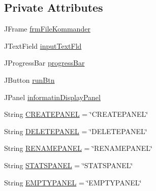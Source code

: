\subsection*{Private Attributes}
\begin{DoxyCompactItemize}
\item 
J\-Frame \hyperlink{classcom_1_1poly_1_1nlp_1_1filekommander_1_1views_1_1_file_kommander_g_u_i_v2_a98fff3b4c6caac91d624b07beab03af5}{frm\-File\-Kommander}
\item 
J\-Text\-Field \hyperlink{classcom_1_1poly_1_1nlp_1_1filekommander_1_1views_1_1_file_kommander_g_u_i_v2_a43db9456e6f586e8a7d59c86dc90cdc8}{input\-Text\-Fld}
\item 
J\-Progress\-Bar \hyperlink{classcom_1_1poly_1_1nlp_1_1filekommander_1_1views_1_1_file_kommander_g_u_i_v2_a610f5e81072e2d7e81ddd92bcd098295}{progress\-Bar}
\item 
J\-Button \hyperlink{classcom_1_1poly_1_1nlp_1_1filekommander_1_1views_1_1_file_kommander_g_u_i_v2_af49b44fc577331b04d2b14c72b22f716}{run\-Btn}
\item 
J\-Panel \hyperlink{classcom_1_1poly_1_1nlp_1_1filekommander_1_1views_1_1_file_kommander_g_u_i_v2_ac0e47bc8b5d4f38b43baae6b72778c1f}{informatin\-Display\-Panel}
\item 
String \hyperlink{classcom_1_1poly_1_1nlp_1_1filekommander_1_1views_1_1_file_kommander_g_u_i_v2_a66c6acbccbc6788ae6e22fe794336e7d}{C\-R\-E\-A\-T\-E\-P\-A\-N\-E\-L} = \char`\"{}C\-R\-E\-A\-T\-E\-P\-A\-N\-E\-L\char`\"{}
\item 
String \hyperlink{classcom_1_1poly_1_1nlp_1_1filekommander_1_1views_1_1_file_kommander_g_u_i_v2_af0da2862825443e7a472a158906d355b}{D\-E\-L\-E\-T\-E\-P\-A\-N\-E\-L} = \char`\"{}D\-E\-L\-E\-T\-E\-P\-A\-N\-E\-L\char`\"{}
\item 
String \hyperlink{classcom_1_1poly_1_1nlp_1_1filekommander_1_1views_1_1_file_kommander_g_u_i_v2_a824c38073bb8503241bf71f231978a73}{R\-E\-N\-A\-M\-E\-P\-A\-N\-E\-L} = \char`\"{}R\-E\-N\-A\-M\-E\-P\-A\-N\-E\-L\char`\"{}
\item 
String \hyperlink{classcom_1_1poly_1_1nlp_1_1filekommander_1_1views_1_1_file_kommander_g_u_i_v2_aff9a87dc378944cb3ab200905c962ef8}{S\-T\-A\-T\-S\-P\-A\-N\-E\-L} = \char`\"{}S\-T\-A\-T\-S\-P\-A\-N\-E\-L\char`\"{}
\item 
String \hyperlink{classcom_1_1poly_1_1nlp_1_1filekommander_1_1views_1_1_file_kommander_g_u_i_v2_a9fe52d973154e43c951c1c674845457d}{E\-M\-P\-T\-Y\-P\-A\-N\-E\-L} = \char`\"{}E\-M\-P\-T\-Y\-P\-A\-N\-E\-L\char`\"{}
\item 

\end{DoxyCompactItemize}
